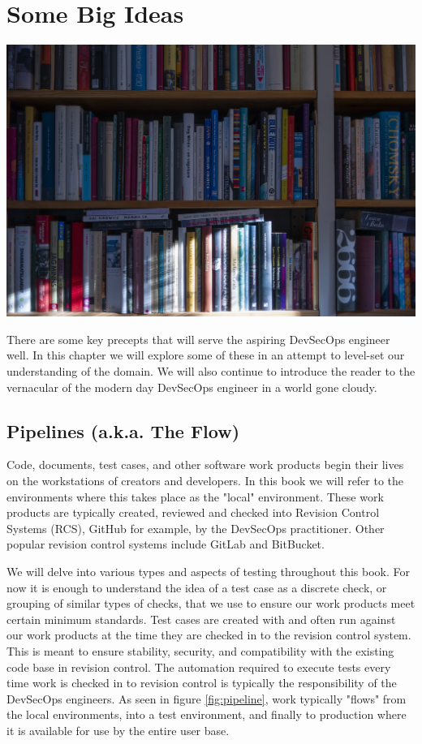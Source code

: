 \chapter{Some Big Ideas}
\includegraphics{../images/book-5104342_1920.jpg}

\justify
There are some key precepts that will serve the aspiring DevSecOps
engineer well. In this chapter we will explore some of these in
an attempt to level-set our understanding of the domain. We will also
continue to introduce the reader to the vernacular
of the modern day DevSecOps engineer in a world gone cloudy.

\section{Pipelines (a.k.a. The Flow)}

\justify
Code, documents, test cases, and other software work products begin
their lives on the workstations of creators and developers. In this
book we will refer to the environments where this takes place as the
"local" environment. These work products are typically created, reviewed and
checked into Revision Control Systems (RCS), 
GitHub for example, by the DevSecOps practitioner. 
Other popular revision control systems include GitLab and 
BitBucket.

\justify
We will delve into various types and aspects of testing 
throughout this book. For now it is enough to understand the idea of
a test case as a discrete check, or grouping of similar types of 
checks, that we use to ensure our work products meet certain minimum
standards.  Test cases are created with and often run against our
work products at the time they are checked in to the revision control
system. This is meant to ensure stability, security, and compatibility
with the existing code base in revision control. The automation required 
to execute tests every time work is checked in to revision control is 
typically the responsibility of the DevSecOps engineers. As seen in 
figure \ref{fig:pipeline}, work typically "flows" from the local environments, 
into a test environment, and finally to production where it is available 
for use by the entire user base.

